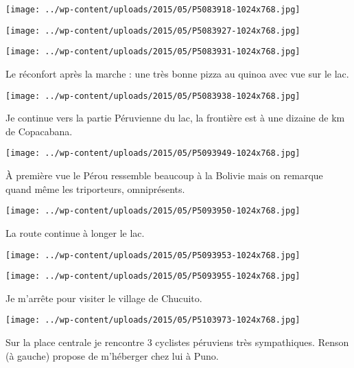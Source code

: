 \centerline{\texttt{[image: ../wp-content/uploads/2015/05/P5083918-1024x768.jpg]} } 
 \newline
 \newline
\centerline{\texttt{[image: ../wp-content/uploads/2015/05/P5083927-1024x768.jpg]} } 
 \newline
 \newline
\centerline{\texttt{[image: ../wp-content/uploads/2015/05/P5083931-1024x768.jpg]} } 
 \newline
 Le réconfort après la marche : une très bonne pizza au quinoa avec vue sur le lac. \newline
 \newline
\centerline{\texttt{[image: ../wp-content/uploads/2015/05/P5083938-1024x768.jpg]} } 
 \newline
 Je continue vers la partie Péruvienne du lac, la frontière est à une dizaine de km de Copacabana. \newline
 \newline
\centerline{\texttt{[image: ../wp-content/uploads/2015/05/P5093949-1024x768.jpg]} } 
 \newline
 À première vue le Pérou ressemble beaucoup à la Bolivie mais on remarque quand même les triporteurs, omniprésents. \newline
 \newline
\centerline{\texttt{[image: ../wp-content/uploads/2015/05/P5093950-1024x768.jpg]} } 
 \newline
 La route continue à longer le lac. \newline
 \newline
\centerline{\texttt{[image: ../wp-content/uploads/2015/05/P5093953-1024x768.jpg]} } 
 \newline
 \newline
\centerline{\texttt{[image: ../wp-content/uploads/2015/05/P5093955-1024x768.jpg]} } 
 \newline
 Je m'arrête pour visiter le village de Chucuito. \newline
 \newline
\centerline{\texttt{[image: ../wp-content/uploads/2015/05/P5103973-1024x768.jpg]} } 
 \newline
 Sur la place centrale je rencontre 3 cyclistes péruviens très sympathiques. Renson (à gauche) propose de m'héberger chez lui à Puno. \newline
 \newline
